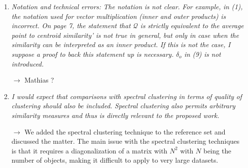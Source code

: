 \documentclass[10pt]{article}
\begin{document}
\begin{enumerate}
\item \emph{Notation and technical errors:
The notation is not clear. For example, in (1), the notation used for vector multiplication (inner and outer products) is incorrect. On page 7, the statement that $\mathcal{Q}$ is strictly equivalent to the average point to centroid similarity' is not true in general, but only in case when the similarity can be interpreted as an inner product. If this is not the case, I suppose a proof to back this statement up is necessary. $\delta_o$ in (9) is not introduced.}

$\rightarrow$ Mathias ?

\item \emph{I would expect that comparisons with spectral clustering in terms of quality of clustering should also be included. Spectral clustering also permits arbitrary similarity measures and thus is directly relevant to the proposed work.}

$\rightarrow$ We added the spectral clustering technique to the reference set and discussed the matter. The main issue with the spectral clustering techniques is that it requires a diagonalization of a matrix with $N^2$ with $N$ being the number of objects, making it difficult to apply to very large datasets.

\end{enumerate}
\end{document}
